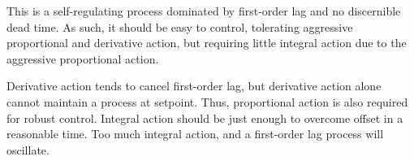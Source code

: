 





This is a self-regulating process dominated by first-order lag and no discernible dead time.  As such, it should be easy to control, tolerating aggressive proportional and derivative action, but requiring little integral action due to the aggressive proportional action.







Derivative action tends to cancel first-order lag, but derivative action alone cannot maintain a process at setpoint.  Thus, proportional action is also required for robust control.  Integral action should be just enough to overcome offset in a reasonable time.  Too much integral action, and a first-order lag process will oscillate.




